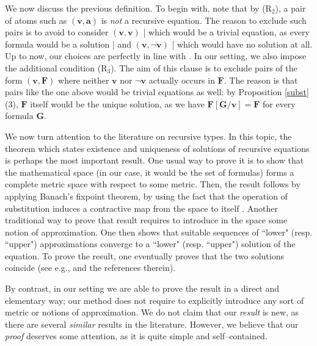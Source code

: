 \documentclass[copyright,creativecommons]{eptcs}
\def\eg{e.g., }
\newcommand{\bF}{\mathbf{F}}
\newcommand{\bG}{\mathbf{G}}
\newcommand{\bba}{\mathbf{a}}
\newcommand{\bbv}{\mathbf{v}}
\theoremstyle{definition}
\begin{document}
We now discuss the previous definition.
To begin with, note that by (R$_2$),    a pair of atoms such as
$(\bbv, \bba)$ is   \emph{not} a recursive equation.
The reason to exclude such pairs is
to avoid  to consider $(\bbv, \bbv)$ | which would be a trivial equation, as every formula would be a solution |
and $(\bbv, \neg \bbv)$ |
which would have  no solution at all.
Up to now, our  choices are perfectly in line with \cite{Courcelle,coppo}.
In our setting,  we also impose the additional condition   (R$_3$). The aim of this clause is to exclude pairs
of the form $(\bbv, \bF)$ where neither
$\bbv$ nor $\neg \bbv$ actually occurs in $\bF$.
The reason is  that   pairs like
the one above would be trivial equations as well:
by Proposition \ref{subst}(3), $\bF$ itself would  be
 the unique solution, as   we have $\bF[\bG/\bbv] = \bF$ for every formula $\bG$.

We now turn attention to the literature on recursive types.
In this topic, the theorem which states
 existence and  uniqueness of solutions of recursive equations
is perhaps the most important result.
One usual way to prove  it is to show that  the mathematical space (in our case, it would be the set of formulas) forms a complete metric space with
respect to some  metric.  Then, the result  follows
by applying Banach's fixpoint theorem,  by using the fact
that the operation of substitution induces
a contractive map from the space  to itself  \cite{Courcelle,coppo}.
Another traditional way
 to prove that result requires to introduce  in the space  some  notion of approximation.  One then shows that   suitable  sequences of ``lower" (resp. ``upper") approximations
converge to a ``lower" (resp. ``upper") solution of the equation.
To prove the result, one eventually proves    that the two solutions coincide (see \eg \cite{MelVou,BT} and the references therein).

By contrast, in our setting we are able to prove the result in  a  direct and elementary way; our method does not require to  explicitly introduce any sort of metric or notions of approximation.
  We do  not claim that our \emph{result} is new, as there are several \emph{similar}  results in the literature.
However, we believe that
our \emph{proof} deserves some attention, as  it is quite simple and self--contained.
\end{document}
